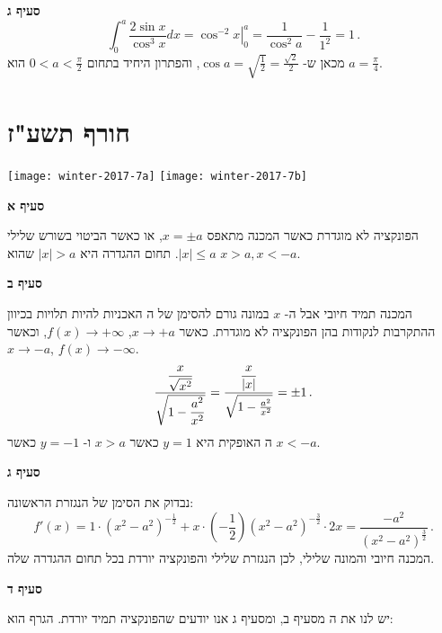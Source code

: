 \textbf{סעיף ג}
\[
\int_0^a \frac{2\sin x}{\cos^3 x}dx = \left. \cos^{-2} x \right|_0^a=\frac{1}{\cos^2 a}-\frac{1}{1^2}=1\,.
\]
מכאן ש-%
$\cos a=\sqrt{\frac{1}{2}}=\frac{\sqrt{2}}{2}$,
והפתרון היחיד בתחום
$0<a<\frac{\pi}{2}$
הוא
$a=\frac{\pi}{4}$.
\np



\section{חורף תשע"ז}

\begin{center}
\texttt{[image: winter-2017-7a]}
\texttt{[image: winter-2017-7b]}
\end{center}

\vspace{-2ex}

\textbf{סעיף א}

הפונקציה לא מוגדרת כאשר המכנה מתאפס
$x=\pm a$,
או כאשר הביטוי בשורש שלילי
$|x|\leq a$.
תחום ההגדרה היא
$|x|>a$
שהוא
$x>a, x<-a$.

\textbf{סעיף ב}

המכנה תמיד חיובי אבל ה-%
$x$
במונה גורם להסימן של ה%
\asms{}
האכניות להיות תלויות בכיוון ההתקרבות לנקודות בהן הפונקציה לא מוגדרת. כאשר 
$x\rightarrow +a$, $f(x)\rightarrow +\infty$,
וכאשר
$x\rightarrow -a$, $f(x)\rightarrow -\infty$.
\[
\frac{\displaystyle\frac{x}{\sqrt{x^2}}}{\sqrt{1-\displaystyle\frac{a^2}{x^2}}}=\displaystyle\frac{\displaystyle\frac{x}{|x|}}{\sqrt{1-\frac{a^2}{x^2}}}=\pm 1\,.
\]
ה%
\asm{}
האופקית היא
$y=1$
כאשר 
$x>a$
ו-%
$y=-1$
כאשר 
$x<-a$.

\textbf{סעיף ג}

נבדוק את הסימן של הנגזרת הראשונה:
\[
f'(x)=1\cdot(x^2-a^2)^{-\frac{1}{2}} + x\cdot \left(-\frac{1}{2}\right)(x^2-a^2)^{-\frac{3}{2}}\cdot 2x=\frac{-a^2}{(x^2-a^2)^{\frac{3}{2}}}\,.
\]
המכנה חיובי והמונה שלילי, לכן הנגזרת שלילי והפונקציה יורדת בכל תחום ההגדרה שלה.

\np

\textbf{סעיף ד}

יש לנו את ה%
\asms{}
מסעיף ב, ומסעיף ג אנו יודעים שהפונקציה תמיד יורדת. הגרף הוא:

\vspace{-1ex}

